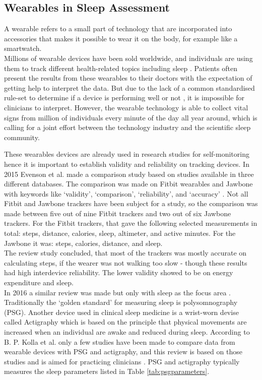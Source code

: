 \documentclass[12pt]{article} %
\begin{document}
\subsection{Wearables in Sleep Assessment}
A wearable refers to a small part of technology that are incorporated into accessories that makes it possible to wear it on the body, for example like a smartwatch. \\

Millions of wearable devices have been sold worldwide, and individuals are using them to track different health-related topics including sleep \cite{boom}. Patients often present the results from these wearables to their doctors with the expectation of getting help to interpret the data. But due to the lack of a common standardised rule-set to determine if a device is performing well or not \cite{boom}, it is impossible for clinicians to interpret. However, the wearable technology is able to collect vital signs from million of individuals every minute of the day all year around, which is calling for a joint effort between the technology industry and the scientific sleep community. 

These wearables devices are already used in research studies for self-monitoring \cite{systematic} hence it is important to establish validity and reliability on tracking devices. In 2015 Evenson et al. made a comparison study based on studies available in three different databases. The comparison was made on Fitbit wearables and Jawbone with keywords like `validity', `comparison', `reliability', and `accuracy' \cite{systematic}. Not all Fitbit and Jawbone trackers have been subject for a study, so the comparison was made between five out of nine Fitbit trackers and two out of six Jawbone trackers. For the Fitbit trackers, that gave the following selected measurements in total: steps, distance, calories, sleep, altimeter, and active minutes. For the Jawbone it was: steps, calories, distance, and sleep. \\

The review study concluded, that most of the trackers was mostly accurate on calculating steps, if the wearer was not walking too slow - though these results had high interdevice reliability. The lower validity showed to be on energy expenditure and sleep.\\

In 2016 a similar review was made but only with sleep as the focus area \cite{consumer}. Traditionally the `golden standard' for measuring sleep is polysomnography (PSG). Another device used in clinical sleep medicine is a wrist-worn devise called Actigraphy which is based on the principle that physical movements are increased when an individual are awake and reduced during sleep. According to B. P. Kolla et al. only a few studies have been made to compare data from wearable devices with PSG and actigraphy, and this review is based on those studies and is aimed for practicing clinicians \cite{consumer}. PSG and actigraphy typically measures the sleep parameters listed in Table \ref{tab:psgparameters}. 
\end{document}
